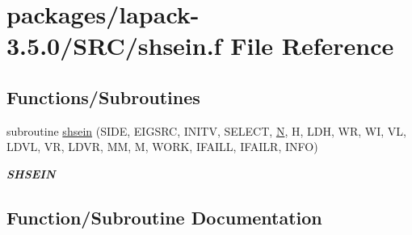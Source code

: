 \hypertarget{shsein_8f}{}\section{packages/lapack-\/3.5.0/\+S\+R\+C/shsein.f File Reference}
\label{shsein_8f}
\subsection*{Functions/\+Subroutines}
\begin{DoxyCompactItemize}
\item 
subroutine \hyperlink{shsein_8f_afeb8d3b5107a64ac1edb3f9d2925435f}{shsein} (S\+I\+D\+E, E\+I\+G\+S\+R\+C, I\+N\+I\+T\+V, S\+E\+L\+E\+C\+T, \hyperlink{polmisc_8c_a0240ac851181b84ac374872dc5434ee4}{N}, H, L\+D\+H, W\+R, W\+I, V\+L, L\+D\+V\+L, V\+R, L\+D\+V\+R, M\+M, M, W\+O\+R\+K, I\+F\+A\+I\+L\+L, I\+F\+A\+I\+L\+R, I\+N\+F\+O)
\begin{DoxyCompactList}\small\item\em {\bfseries S\+H\+S\+E\+I\+N} \end{DoxyCompactList}\end{DoxyCompactItemize}


\subsection{Function/\+Subroutine Documentation}
\hypertarget{shsein_8f_afeb8d3b5107a64ac1edb3f9d2925435f}{}
